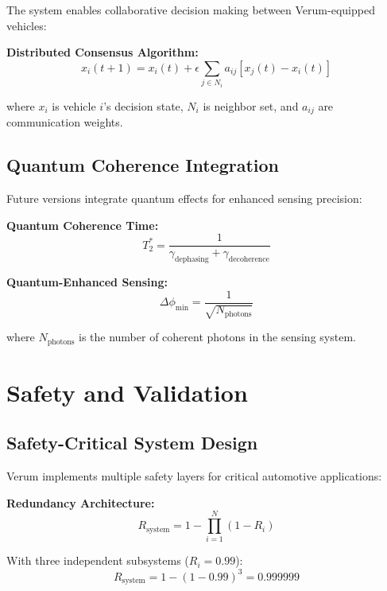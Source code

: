 \documentclass[11pt,a4paper]{article}
\begin{document}
The system enables collaborative decision making between Verum-equipped vehicles:

\textbf{Distributed Consensus Algorithm:}
\begin{equation}
x_i(t+1) = x_i(t) + \epsilon \sum_{j \in N_i} a_{ij}[x_j(t) - x_i(t)]
\end{equation}

where $x_i$ is vehicle $i$'s decision state, $N_i$ is neighbor set, and $a_{ij}$ are communication weights.

\subsection{Quantum Coherence Integration}

Future versions integrate quantum effects for enhanced sensing precision:

\textbf{Quantum Coherence Time:}
\begin{equation}
T_2^* = \frac{1}{\gamma_{\text{dephasing}} + \gamma_{\text{decoherence}}}
\end{equation}

\textbf{Quantum-Enhanced Sensing:}
\begin{equation}
\Delta \phi_{\text{min}} = \frac{1}{\sqrt{N_{\text{photons}}}}
\end{equation}

where $N_{\text{photons}}$ is the number of coherent photons in the sensing system.

\section{Safety and Validation}

\subsection{Safety-Critical System Design}

Verum implements multiple safety layers for critical automotive applications:

\textbf{Redundancy Architecture:}
\begin{equation}
R_{\text{system}} = 1 - \prod_{i=1}^{N} (1 - R_i)
\end{equation}

With three independent subsystems ($R_i = 0.99$):
\begin{equation}
R_{\text{system}} = 1 - (1 - 0.99)^3 = 0.999999
\end{equation}
\end{document}
